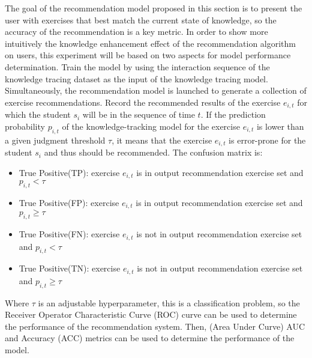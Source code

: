The goal of the recommendation model proposed in this section is to present the user with exercises that best match the current state of knowledge, so the accuracy of the recommendation is a key metric. In order to show more intuitively the knowledge enhancement effect of the recommendation algorithm on users, this experiment will be based on two aspects for model performance determination. Train the model by using the interaction sequence of the knowledge tracing dataset as the input of the knowledge tracing model. Simultaneously, the recommendation model is launched to generate a collection of exercise recommendations. Record the recommended results of the exercise \(e_{i,t}\) for which the student \(s_i\) will be in the sequence of time \(t\). If the prediction probability \(p_{i,t}\) of the knowledge-tracking model for the exercise \(e_{i,t}\) is lower than a given judgment threshold \(\tau \), it means that the exercise \(e_{i,t}\) is error-prone for the student \(s_i\) and thus should be recommended. The confusion matrix is:
\begin{itemize}
  \item True Positive(TP): exercise \(e_{i,t}\) is in output recommendation exercise set and \(p_{i,t}<\tau \)
  \item True Positive(FP): exercise \(e_{i,t}\) is in output recommendation exercise set and \(p_{i,t}\geq \tau \)
  \item True Positive(FN): exercise \(e_{i,t}\) is not in output recommendation exercise set and \(p_{i,t}<\tau \)
  \item True Positive(TN): exercise \(e_{i,t}\) is not in output recommendation exercise set and \(p_{i,t}\geq \tau \)
\end{itemize}
Where \(\tau \) is an adjustable hyperparameter, this is a classification problem, so the Receiver Operator Characteristic Curve (ROC) curve can be used to determine the performance of the recommendation system. Then, (Area Under Curve) AUC and Accuracy (ACC) metrics can be used to determine the performance of the model.

